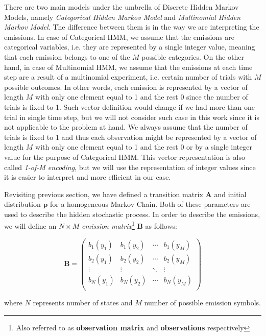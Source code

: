 There are two main models under the umbrella of Discrete Hidden Markov Models, namely \textit{Categorical Hidden Markov Model} and \textit{Multinomial Hidden Markov Model}. The difference between them 
is in the way we are interpreting the emissions. In case of Categorical HMM, we assume that the emissions are categorical variables, i.e. they are represented by a single integer value,
meaning that each emission belongs to one of the $M$ possible categories. On the other hand, in case of Multinomial HMM, we assume that the emissions at each time step are a result of a multinomial experiment,
i.e. certain number of trials with $M$ possible outcomes. In other words, each emission is represented by a vector of length $M$ with only one element equal to 1 and the rest 0 since the number of trials is fixed to 1.
Such vector definition would change if we had more than one trial in single time step, but we will not consider such case in this work since it is not applicable to the problem at hand. We always assume that the number of trials is fixed to 1
and thus each observation might be represented by a vector of length $M$ with only one element equal to 1 and the rest 0 or by a single integer value for the purpose of Categorical HMM. This vector representation is also called \textit{1-of-M encoding}, but 
we will use the representation of integer values since it is easier to interpret and more efficient in our case.

Revisiting previous section, we have defined a transition matrix $\textbf{A}$ and initial distribution $\textbf{p}$ for a homogeneous Markov Chain. Both of these parameters are used to describe the hidden stochastic process.
In order to describe the emissions, we will define an $N \times M$ \textit{emission matrix}\footnote{Also referred to as \textbf{observation matrix} and \textbf{observations} respectively} $\textbf{B}$ as follows:

\begin{equation}
    \textbf{B} = \begin{pmatrix}
    b_1(y_1) & b_1(y_2) & \cdots & b_1(y_M) \\
    b_2(y_1) & b_2(y_2) & \cdots & b_2(y_M) \\
    \vdots & \vdots & \ddots & \vdots \\
    b_N(y_1) & b_N(y_2) & \cdots & b_N(y_M) \\
    \end{pmatrix}
\end{equation}

\noindent where $N$ represents number of states and $M$ number of possible emission symbols.

